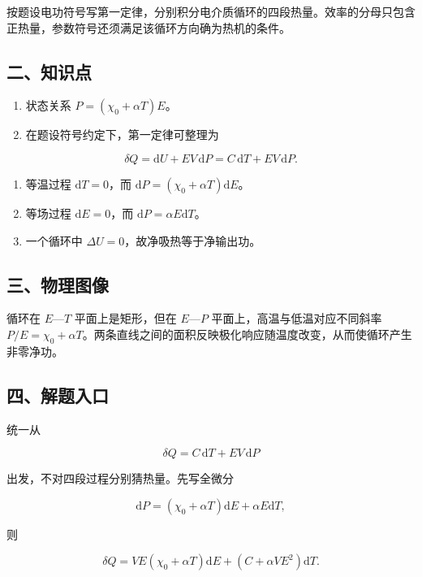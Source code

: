 \documentclass[12pt,a4paper,UTF8]{ctexart}
\newcommand{\tightlist}{\setlength{\itemsep}{0pt}\setlength{\parskip}{0pt}}
\begin{document}
按题设电功符号写第一定律，分别积分电介质循环的四段热量。效率的分母只包含正热量，参数符号还须满足该循环方向确为热机的条件。

\subsection{二、知识点}\label{ux4e8cux77e5ux8bc6ux70b9-5}

\begin{enumerate}
\def\labelenumi{\arabic{enumi}.}
\tightlist
\item
  状态关系 \(P=(\chi_0+\alpha T)E\)。
\item
  在题设符号约定下，第一定律可整理为
\end{enumerate}

\[\delta Q=\mathrm dU+EV\,\mathrm dP=C\,\mathrm dT+EV\,\mathrm dP.\]

\begin{enumerate}
\def\labelenumi{\arabic{enumi}.}
\setcounter{enumi}{2}
\tightlist
\item
  等温过程 \(\mathrm dT=0\)，而
  \(\mathrm dP=(\chi_0+\alpha T)\mathrm dE\)。
\item
  等场过程 \(\mathrm dE=0\)，而 \(\mathrm dP=\alpha E\mathrm dT\)。
\item
  一个循环中 \(\Delta U=0\)，故净吸热等于净输出功。
\end{enumerate}

\subsection{三、物理图像}\label{ux4e09ux7269ux7406ux56feux50cf-5}

循环在 \(E\)---\(T\) 平面上是矩形，但在 \(E\)---\(P\)
平面上，高温与低温对应不同斜率
\(P/E=\chi_0+\alpha T\)。两条直线之间的面积反映极化响应随温度改变，从而使循环产生非零净功。

\subsection{四、解题入口}\label{ux56dbux89e3ux9898ux5165ux53e3-5}

统一从

\[\delta Q=C\,\mathrm dT+EV\,\mathrm dP\]

出发，不对四段过程分别猜热量。先写全微分

\[\mathrm dP=(\chi_0+\alpha T)\mathrm dE+\alpha E\mathrm dT,\]

则

\[\delta Q
=V E(\chi_0+\alpha T)\mathrm dE
+(C+\alpha VE^2)\mathrm dT.\]
\end{document}
